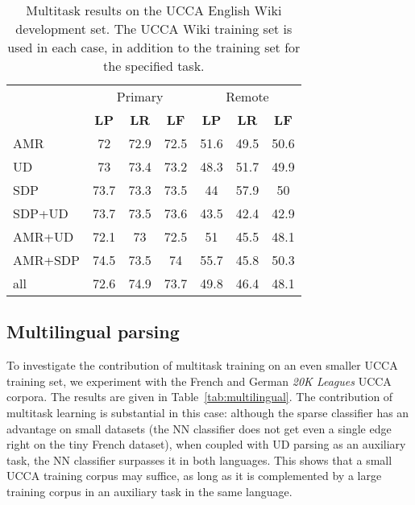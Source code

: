 \documentclass[11pt,a4paper]{article}
\begin{document}
\begin{table}
\begin{tabular}{lccc|ccc}
& \multicolumn{3}{c|}{Primary} & \multicolumn{3}{c}{Remote} \\
& \textbf{LP} & \textbf{LR} & \textbf{LF} & \textbf{LP} & \textbf{LR} & \textbf{LF} \\
\small AMR & 72 & 72.9 & 72.5 & 51.6 & 49.5 & 50.6 \\
\small UD & 73 & 73.4 & 73.2 & 48.3 & 51.7 & 49.9 \\
\small SDP & 73.7 & 73.3 & 73.5 & 44 & 57.9 & 50 \\
\small SDP+UD & 73.7 & 73.5 & 73.6 & 43.5 & 42.4 & 42.9 \\
\small AMR+UD & 72.1 & 73 & 72.5 & 51 & 45.5 & 48.1 \\
\small AMR+SDP & 74.5 & 73.5 & 74 & 55.7 & 45.8 & 50.3 \\
\small all & 72.6 & 74.9 & 73.7 & 49.8 & 46.4 & 48.1
\end{tabular}
\caption{Multitask results on the UCCA English Wiki development set.
The UCCA Wiki training set is used in each case, in addition to the training
set for the specified task.\label{tab:multi}}
\end{table}


\subsection{Multilingual parsing}\label{sec:multilingual}

To investigate the contribution of multitask training on an even smaller UCCA training set,
we experiment with the French and German \textit{20K Leagues} UCCA corpora.
The results are given in Table~\ref{tab:multilingual}.
The contribution of multitask learning is substantial in this case:
although the sparse classifier has an advantage on small datasets
(the NN classifier does not get even a single edge right on the tiny French dataset),
when coupled with UD parsing as an auxiliary task, the NN classifier surpasses it
in both languages.
This shows that a small UCCA training corpus may suffice, as long as it is complemented by
a large training corpus in an auxiliary task in the same language.
\end{document}
